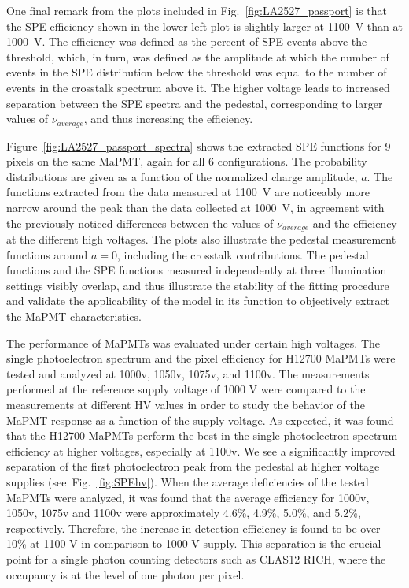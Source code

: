 One final remark from the plots included in Fig.~\ref{fig:LA2527_passport} is that the SPE efficiency shown in the lower-left plot is slightly larger at 1100~V than at 1000~V. The efficiency was defined as the percent of SPE events above the threshold, which, in turn, was defined as the amplitude at which the number of events in the SPE distribution below the threshold was equal to the number of events in the crosstalk spectrum above it. The higher voltage leads to increased separation between the SPE spectra and the pedestal, corresponding to larger values of $\nu_{average}$, and thus increasing the efficiency. 

Figure~\ref{fig:LA2527_passport_spectra} shows the extracted SPE functions for 9 pixels on the same MaPMT, again for all 6 configurations. The probability distributions are given as a function of the normalized charge amplitude, $a$. The functions extracted from the data measured at 1100~V are noticeably more narrow around the peak than the data collected at 1000~V, in agreement with the previously noticed differences between the values of $\nu_{average}$ and the efficiency at the different high voltages. The plots also illustrate the pedestal measurement functions around $a=0$, including the crosstalk contributions. The pedestal functions and the SPE functions measured independently at three illumination settings visibly overlap, and thus illustrate the stability of the fitting procedure and validate the applicability of the model in its function to objectively extract the MaPMT characteristics.


\iffalse
The performance of MaPMTs was evaluated under certain high voltages.
The single photoelectron spectrum and the pixel efficiency for H12700 MaPMTs were tested and analyzed at 1000v, 1050v, 1075v, and 1100v.
The measurements performed at the reference supply voltage of 1000 V were compared to the measurements at different HV values in order to study the behavior of the MaPMT response as a function of the supply voltage.
As expected, it was found that the H12700 MaPMTs perform the best in the single photoelectron spectrum efficiency at higher voltages, especially at 1100v.
We see a significantly improved separation of the first photoelectron peak from the pedestal at higher voltage supplies (see~Fig.~\ref{fig:SPEhv}).
When the average deficiencies of the tested MaPMTs were analyzed, it was found that the average efficiency for 1000v, 1050v, 1075v and 1100v were approximately 4.6\%, 4.9\%, 5.0\%, and 5.2\%, respectively.
Therefore, the increase in detection efficiency is found to be over 10\% at 1100 V in comparison to 1000 V supply.
This separation is the crucial point for a single photon counting detectors such as CLAS12 RICH, where the occupancy is at the level of one photon per pixel.



